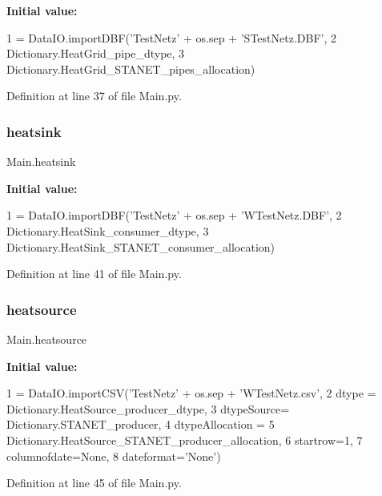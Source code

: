 {\bfseries Initial value\+:}
\begin{DoxyCode}
1 =  DataIO.importDBF(\textcolor{stringliteral}{'TestNetz'} + os.sep + \textcolor{stringliteral}{'STestNetz.DBF'},
2                                   Dictionary.HeatGrid\_pipe\_dtype,
3                                   Dictionary.HeatGrid\_STANET\_pipes\_allocation)
\end{DoxyCode}


Definition at line 37 of file Main.\+py.

\mbox{\label{namespace_main_a26af29b8548cf87e8d31234213cde312}} 
\subsubsection{\texorpdfstring{heatsink}{heatsink}}
{\footnotesize\ttfamily Main.\+heatsink}

{\bfseries Initial value\+:}
\begin{DoxyCode}
1 =  DataIO.importDBF(\textcolor{stringliteral}{'TestNetz'} + os.sep + \textcolor{stringliteral}{'WTestNetz.DBF'},
2                                Dictionary.HeatSink\_consumer\_dtype,
3                                Dictionary.HeatSink\_STANET\_consumer\_allocation)
\end{DoxyCode}


Definition at line 41 of file Main.\+py.

\mbox{\label{namespace_main_a1dbfe33a196057c1fc788403424dea4c}} 
\subsubsection{\texorpdfstring{heatsource}{heatsource}}
{\footnotesize\ttfamily Main.\+heatsource}

{\bfseries Initial value\+:}
\begin{DoxyCode}
1 =  DataIO.importCSV(\textcolor{stringliteral}{'TestNetz'} + os.sep + \textcolor{stringliteral}{'WTestNetz.csv'},
2                               dtype = Dictionary.HeatSource\_producer\_dtype,
3                               dtypeSource= Dictionary.STANET\_producer,
4                               dtypeAllocation =
5                               Dictionary.HeatSource\_STANET\_producer\_allocation,
6                               startrow=1,
7                               columnofdate=\textcolor{keywordtype}{None},
8                               dateformat=\textcolor{stringliteral}{'None'})
\end{DoxyCode}


Definition at line 45 of file Main.\+py.

